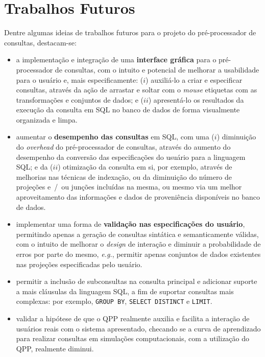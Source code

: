 \section{Trabalhos Futuros}

Dentre algumas ideias de trabalhos futuros para o projeto do pré-processador de consultas, destacam-se:

\begin{itemize}
    \item a implementação e integração de uma \textbf{interface gráfica} para o pré-processador de consultas, com o intuito e potencial de melhorar a usabilidade para o usuário e, mais especificamente: (\(i\)) auxiliá-lo a criar e especificar consultas, através da ação de arrastar e soltar com o \textit{mouse} etiquetas com as transformações e conjuntos de dados; e (\(ii\)) apresentá-lo os resultados da execução da consulta em SQL no banco de dados de forma visualmente organizada e limpa.
    \item aumentar o \textbf{desempenho das consultas} em SQL, com uma (\(i\)) diminuição do \textit{overhead} do pré-processador de consultas, através do aumento do desempenho da conversão das especificações do usuário para a linguagem SQL; e da (\(ii\)) otimização da consulta em si, por exemplo, através de melhorias nas técnicas de indexação, ou da diminuição do número de projeções e~/~ou junções incluídas na mesma, ou mesmo via um melhor aproveitamento das informações e dados de proveniência disponíveis no banco de dados.
    \item implementar uma forma de \textbf{validação nas especificações do usuário}, permitindo apenas a geração de consultas sintática e semanticamente válidas, com o intuito de melhorar o \textit{design} de interação e diminuir a probabilidade de erros por parte do mesmo, \textit{e.g.}, permitir apenas conjuntos de dados existentes nas projeções especificadas pelo usuário.
    \item permitir a inclusão de subconsultas na consulta principal e adicionar suporte a mais cláusulas da linguagem SQL, a fim de suportar consultas mais complexas: por exemplo, \texttt{GROUP BY}, \texttt{SELECT DISTINCT} e \texttt{LIMIT}.
    \item validar a hipótese de que o QPP realmente auxilia e facilita a interação de usuários reais com o sistema apresentado, checando se a curva de aprendizado para realizar consultas em simulações computacionais, com a utilização do QPP, realmente diminui.
\end{itemize}
